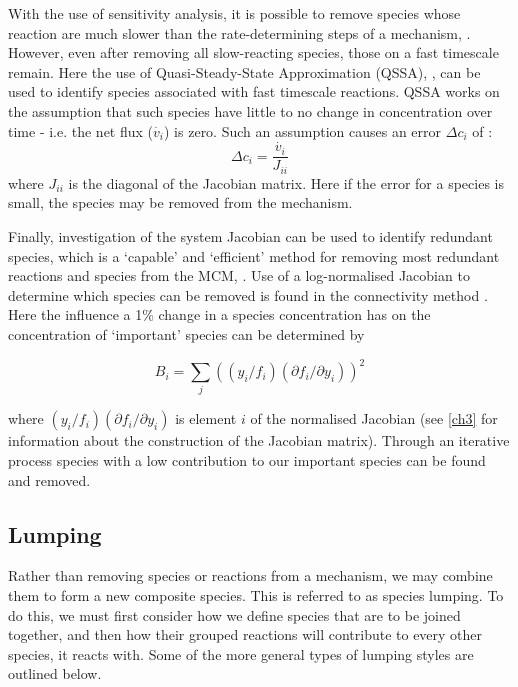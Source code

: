 With the use of sensitivity analysis, it is possible to remove species whose reaction are much slower than the rate-determining steps of a mechanism, \citep{frenk}. However, even after removing all slow-reacting species, those on a fast timescale remain. Here the use of Quasi-Steady-State Approximation (QSSA), \citep{QSSA}, can be used to identify species associated with fast timescale reactions. QSSA works on the assumption that such species have little to no change in concentration over time - i.e. the net flux ($\dot{v_i}$) is zero. Such an assumption causes an error $\Delta c_i$ of :
\begin{equation}
    \Delta c_i = \frac{\dot{v_i}}{J_{ii}}
\end{equation}
where $J_{ii}$ is the diagonal of the Jacobian matrix. Here if the error for a species is small, the species may be removed from the mechanism.


Finally, investigation of the system Jacobian can be used to identify redundant species, which is a `capable' and `efficient' method for removing most redundant reactions and species from the MCM, \citep{QSSA}. Use of a log-normalised Jacobian to determine which species can be removed is found in the connectivity method \citep{connectivity,cm}.
Here the influence a 1\%  change in a species concentration has on the concentration of `important' species can be determined by

\begin{equation}
B_i  = \sum_j(({y_i}/{f_i})({\partial f_i}/{\partial y_i}))^2 \label{connectivity}
\end{equation}

 where $({y_i}/{f_i})({\partial f_i}/{\partial y_i})$ is element $i$ of the normalised Jacobian (see \autoref{ch3} for information about the construction of the Jacobian matrix). Through an iterative process species with a low contribution to our important species can be found and removed.


\subsection{Lumping}

Rather than removing species or reactions from a mechanism, we may combine them to form a new composite species. This is referred to as species lumping. To do this, we must first consider how we define species that are to be joined together, and then how their grouped reactions will contribute to every other species, it reacts with. Some of the more general types of lumping styles are outlined below.


